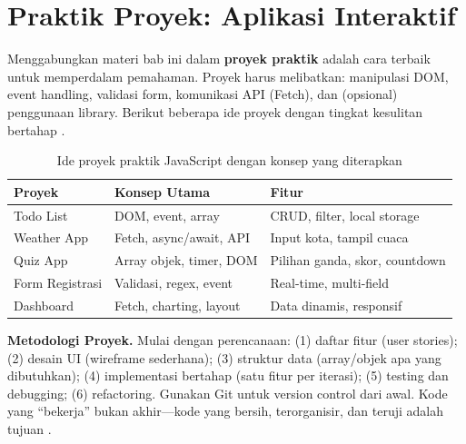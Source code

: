 \section{Praktik Proyek: Aplikasi Interaktif}

Menggabungkan materi bab ini dalam \textbf{proyek praktik} adalah cara terbaik untuk memperdalam pemahaman. Proyek harus melibatkan: manipulasi DOM, event handling, validasi form, komunikasi API (Fetch), dan (opsional) penggunaan library. Berikut beberapa ide proyek dengan tingkat kesulitan bertahap \cite{mdnJsGuide}.

\begin{table}[htbp]
\centering
\begin{tabular}{|P{3.5cm}|P{3.5cm}|P{5cm}|}
\hline
\textbf{Proyek} & \textbf{Konsep Utama} & \textbf{Fitur} \\
\hline
Todo List & DOM, event, array & CRUD, filter, local storage \\
\hline
Weather App & Fetch, async/await, API & Input kota, tampil cuaca \\
\hline
Quiz App & Array objek, timer, DOM & Pilihan ganda, skor, countdown \\
\hline
Form Registrasi & Validasi, regex, event & Real-time, multi-field \\
\hline
Dashboard & Fetch, charting, layout & Data dinamis, responsif \\
\hline
\end{tabular}
\caption{Ide proyek praktik JavaScript dengan konsep yang diterapkan}
\end{table}

\begin{konsep}
\textbf{Metodologi Proyek.} Mulai dengan perencanaan: (1) daftar fitur (user stories); (2) desain UI (wireframe sederhana); (3) struktur data (array/objek apa yang dibutuhkan); (4) implementasi bertahap (satu fitur per iterasi); (5) testing dan debugging; (6) refactoring. Gunakan Git untuk version control dari awal. Kode yang ``bekerja'' bukan akhir---kode yang bersih, terorganisir, dan teruji adalah tujuan \cite{mdnToolsTesting}.
\end{konsep}

